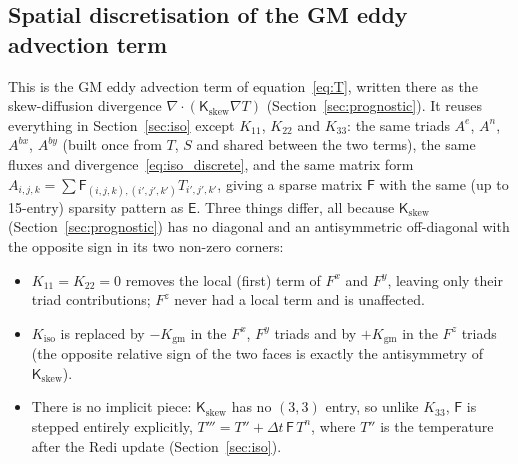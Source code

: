 \documentclass{article}
\begin{document}
\subsection{Spatial discretisation of the GM eddy advection term}\label{sec:gm}

This is the GM eddy advection term of equation~\eqref{eq:T}, written there as the skew-diffusion divergence $\nabla\cdot(\mathsf{K}_\text{skew}\nabla T)$ (Section~\ref{sec:prognostic}).
It reuses everything in Section~\ref{sec:iso} except $K_{11}$, $K_{22}$ and $K_{33}$: the same triads $A^e$, $A^n$, $A^{bx}$, $A^{by}$ (built once from $T$, $S$ and shared between the two terms), the same fluxes and divergence~\eqref{eq:iso_discrete}, and the same matrix form $A_{i,j,k}=\sum \mathsf{F}_{(i,j,k),(i',j',k')}T_{i',j',k'}$, giving a sparse matrix $\mathsf{F}$ with the same (up to 15-entry) sparsity pattern as $\mathsf{E}$.
Three things differ, all because $\mathsf{K}_\text{skew}$ (Section~\ref{sec:prognostic}) has no diagonal and an antisymmetric off-diagonal with the opposite sign in its two non-zero corners:
\begin{itemize}
\item $K_{11}=K_{22}=0$ removes the local (first) term of $F^x$ and $F^y$, leaving only their triad contributions; $F^z$ never had a local term and is unaffected.
\item $K_\text{iso}$ is replaced by $-K_\text{gm}$ in the $F^x$, $F^y$ triads and by $+K_\text{gm}$ in the $F^z$ triads (the opposite relative sign of the two faces is exactly the antisymmetry of $\mathsf{K}_\text{skew}$).
\item There is no implicit piece: $\mathsf{K}_\text{skew}$ has no $(3,3)$ entry, so unlike $K_{33}$, $\mathsf{F}$ is stepped entirely explicitly, $T''' = T'' + \Delta t\,\mathsf{F}\,T^n$, where $T''$ is the temperature after the Redi update (Section~\ref{sec:iso}).
\end{itemize}
\end{document}

